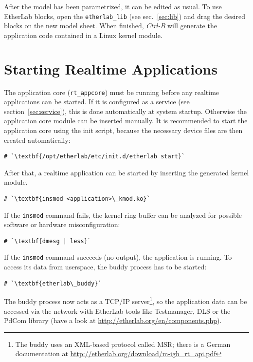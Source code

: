 After the model has been parametrized, it can be edited as usual. To use
EtherLab blocks, open the \texttt{etherlab\_lib} (see sec.~\ref{sec:lib}) and
drag the desired blocks on the new model sheet. When finished, \textit{Ctrl-B}
will generate the application code contained in a Linux kernel module.


\chapter{Starting Realtime Applications}
\label{sec:start}

The application core (\lstinline+rt_appcore+) must be running before any
realtime applications can be started. If it is configured as a service (see
section~\ref{sec:service}), this is done automatically at system startup.
Otherwise the application core module can be inserted manually. It is
recommended to start the application core using the init script, because the
necessary device files are then created automatically:

\begin{lstlisting}[gobble=2]
  # `\textbf{/opt/etherlab/etc/init.d/etherlab start}`
\end{lstlisting}

After that, a realtime application can be started by inserting the generated
kernel module.

\begin{lstlisting}[gobble=2]
  # `\textbf{insmod <application>\_kmod.ko}`
\end{lstlisting}

If the \lstinline+insmod+ command fails, the kernel ring buffer can be
analyzed for possible software or hardware misconfiguration:

\begin{lstlisting}[gobble=2]
  # `\textbf{dmesg | less}`
\end{lstlisting}

If the \lstinline+insmod+ command succeeds (no output), the application is
running. To access its data from userspace, the buddy process has to be
started:

\begin{lstlisting}[gobble=2]
  # `\textbf{etherlab\_buddy}`
\end{lstlisting}

The buddy process now acts as a TCP/IP server\footnote{The buddy uses an
XML-based protocol called MSR; there is a German documentation at
\url{http://etherlab.org/download/m-igh_rt_api.pdf}}, so the application data
can be accessed via the network with EtherLab tools like Testmanager, DLS or
the PdCom library (have a look at
\url{http://etherlab.org/en/components.php}).

